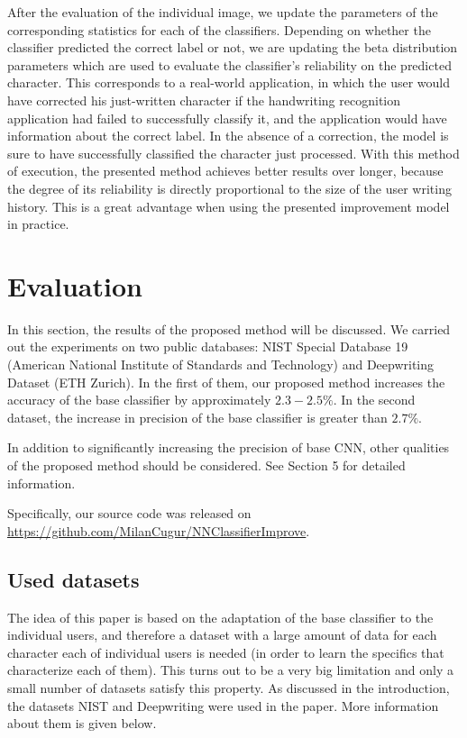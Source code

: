 \documentclass{article}
\begin{document}
After the evaluation of the individual image, we update the parameters of the corresponding statistics for each of the classifiers. 
Depending on whether the classifier predicted the correct label or not, we are updating the beta distribution parameters which are used to evaluate the classifier's reliability on the predicted character. 
This corresponds to a real-world application, in which the user would have corrected his just-written character if the handwriting recognition application had failed to successfully classify it, 
and the application would have information about the correct label. 
In the absence of a correction, the model is sure to have successfully classified the character just processed. 
With this method of execution, the presented method achieves better results over longer, because the degree of its reliability is directly proportional to the size of the user writing history. 
This is a great advantage when using the presented improvement model in practice.  

\section{Evaluation}

In this section, the results of the proposed method will be discussed. 
We carried out the experiments on two public databases: NIST Special Database 19 (American National Institute of Standards and Technology) and 
Deepwriting Dataset (ETH Zurich). %
In the first of them, our proposed method increases the accuracy of the base classifier by approximately $2.3-2.5\%$. 
In the second dataset, the increase in precision of the base classifier is greater than $2.7\%$. 

In addition to significantly increasing the precision of base CNN, other qualities of the proposed method should be considered. 
See Section 5 for detailed information. %

Specifically, our source code was released on \url{https://github.com/MilanCugur/NNClassifierImprove}.

\subsection{Used datasets}

The idea of this paper is based on the adaptation of the base classifier to the individual users, 
and therefore a dataset with a large amount of data for each character each of individual users is needed 
(in order to learn the specifics that characterize each of them). 
This turns out to be a very big limitation and only a small number of datasets satisfy this property. 
As discussed in the introduction, the datasets NIST and Deepwriting were used in the paper. 
More information about them is given below. 
\end{document}
